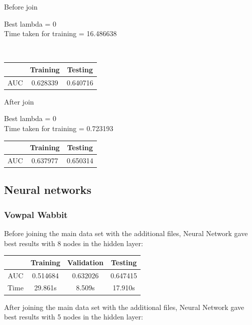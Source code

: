 \documentclass[10pt]{article}
\begin{document}
Before join

	Best lambda = 0 
\\

	Time taken for training = 16.486638

\\
\begin{center}
 \begin{tabular}{|c | c | c ||} 
 \hline
 & Training & Testing\\ [0.5ex] 
 \hline\hline
AUC & 0.628339 & 0.640716\\
 \hline
\end{tabular}
\end{center}

After join

	Best lambda = 0
\\
	Time taken for training = 0.723193
\\
\begin{center}
 \begin{tabular}{|c | c | c ||} 
 \hline
 & Training & Testing\\ [0.5ex] 
 \hline\hline
AUC & 0.637977 & 0.650314\\
 \hline
\end{tabular}
\end{center}


\subsection{Neural networks}
\subsubsection{Vowpal Wabbit}
Before joining the main data set with the additional files, Neural Network gave best results with 8 nodes in the hidden layer:\\

\begin{center}
 \begin{tabular}{|c | c | c | c||} 
 \hline
 & Training & Validation & Testing\\ [0.5ex] 
 \hline\hline
AUC & 0.514684 & 0.632026 & 0.647415\\
 \hline
Time & 29.861s & 8.509s & 17.910s\\ 
 \hline
\end{tabular}
\end{center}

After joining the main data set with the additional files, Neural Network gave best results with 5 nodes in the hidden layer:\\
\end{document}

